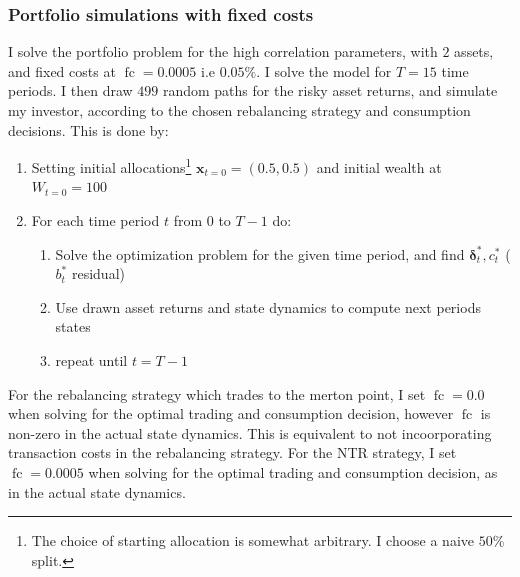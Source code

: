 \documentclass[11pt]{article}
\begin{document}
\subsubsection{Portfolio simulations with fixed costs}  \label{Subsubsection: Portfolio_Simulations_Proportional}
I solve the portfolio problem for the high correlation parameters, with $2$ assets, and fixed costs at $\operatorname{fc} = 0.0005$ i.e $0.05\%$.
I solve the model for $T = 15$ time periods. I then draw $499$ random paths for the risky asset returns, and
simulate my investor, according to the chosen rebalancing strategy and consumption decisions. This is done by:
\begin{enumerate}
    \item Setting initial allocations\footnote{The choice of starting allocation is somewhat arbitrary. I choose a naive $50$\% split.} $\mathbf{x}_{t=0} = (0.5 , 0.5)$ and initial wealth at $W_{t=0} = 100$
    \item For each time period $t$ from $0$ to $T-1$ do:
    \begin{enumerate}
        \item Solve the optimization problem for the given time period, and find $\boldsymbol{\delta}^{*}_{t}, c^{*}_{t}$ ($b^{*}_t$ residual)
        \item Use drawn asset returns and state dynamics to compute next periods states
        \item repeat until $t = T-1$
    \end{enumerate}
\end{enumerate}
For the rebalancing strategy which trades to the merton point, I set $\operatorname{fc} = 0.0$ when solving for the optimal trading and consumption decision,
however $\operatorname{fc}$ is non-zero in the actual state dynamics. This is equivalent to not incoorporating transaction costs in the rebalancing strategy.
For the \ac{NTR} strategy, I set $\operatorname{fc} = 0.0005$ when solving for the optimal trading and consumption decision, as in the actual state dynamics.
\end{document}
